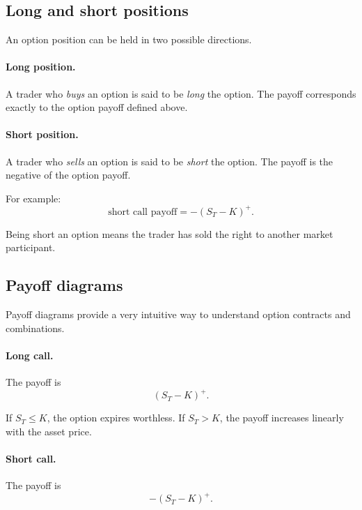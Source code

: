 \documentclass[11pt]{article}
\newcommand{\1}{\mathbf{1}}
\theoremstyle{plain}
\theoremstyle{definition}
\theoremstyle{remark}
\begin{document}
\subsection{Long and short positions}

An option position can be held in two possible directions.

\paragraph{Long position.}
A trader who \emph{buys} an option is said to be \emph{long} the option.
The payoff corresponds exactly to the option payoff defined above.

\paragraph{Short position.}
A trader who \emph{sells} an option is said to be \emph{short} the option.
The payoff is the negative of the option payoff.

For example:
\[
\text{short call payoff} = -(S_T-K)^+.
\]

Being short an option means the trader has sold the right to another market participant.

\subsection{Payoff diagrams}

Payoff diagrams provide a very intuitive way to understand option
contracts and combinations.

\paragraph{Long call.}
The payoff is
\[
(S_T-K)^+.
\]

If \(S_T\le K\), the option expires worthless.  
If \(S_T>K\), the payoff increases linearly with the asset price.

\begin{center}
\end{center}

\paragraph{Short call.}
The payoff is
\[
-(S_T-K)^+.
\]
\end{document}
